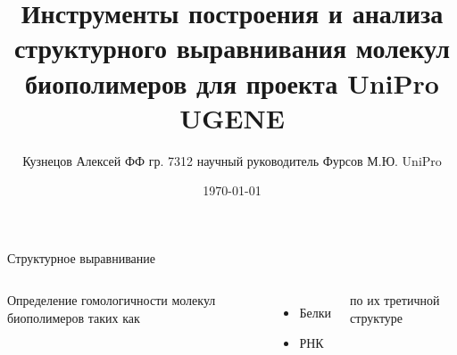 \documentclass[utf8, professionalfont]{beamer}
\title[Построение структурного выравнивания]{Инструменты построения и анализа структурного выравнивания молекул биополимеров для проекта UniPro UGENE}
\author[Кузнецов Алексей]{Кузнецов Алексей ФФ гр. 7312 \linebreak научный руководитель Фурсов М.Ю. UniPro}
\institute{Новосибирский Государственный Университет}
\date{\today}
\begin{document}

\begin{frame}
\titlepage
\end{frame}

\begin{frame}{Структурное выравнивание}
\begin{columns}[c]
	Определение гомологичности молекул биополимеров таких как
	\begin{itemize}
		\item Белки
		\item РНК
	\end{itemize}
	по их третичной структуре

\end{columns}

\end{frame}
\end{document}
